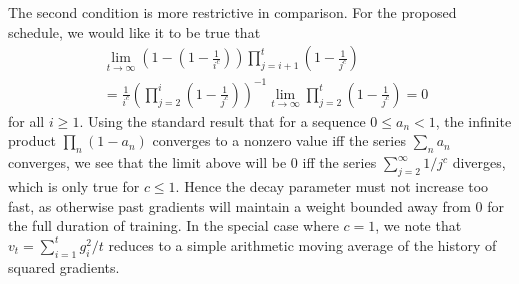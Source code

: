\documentclass{article}
\begin{document}
The second condition is more restrictive in comparison. For the proposed schedule, we would like it to be true that
\begin{align*}
& \lim_{t \to \infty} \left( 1 - \left( 1 - \frac{1}{i^c} \right) \right) \prod_{j=i+1}^t \left( 1 - \frac{1}{j^c} \right) \\
& = \frac{1}{i^c} \left( \prod_{j=2}^i \left( 1 - \frac{1}{j^c} \right) \right)^{-1} \lim_{t \to \infty} \prod_{j=2}^t \left( 1 - \frac{1}{j^c} \right) = 0
\end{align*}
for all $i \ge 1$. Using the standard result that for a sequence $0 \le a_n < 1$, the infinite product $\prod_n (1 - a_n)$ converges to a nonzero value iff the series $\sum_n a_n$ converges, we see that the limit above will be 0 iff the series $\sum_{j=2}^\infty 1/j^c$ diverges, which is only true for $c \le 1$. Hence the decay parameter must not increase too fast, as otherwise past gradients will maintain a weight bounded away from 0 for the full duration of training. In the special case where $c=1$, we note that $v_t = \sum_{i=1}^t g_i^2 / t$ reduces to a simple arithmetic moving average of the history of squared gradients.
\end{document}
